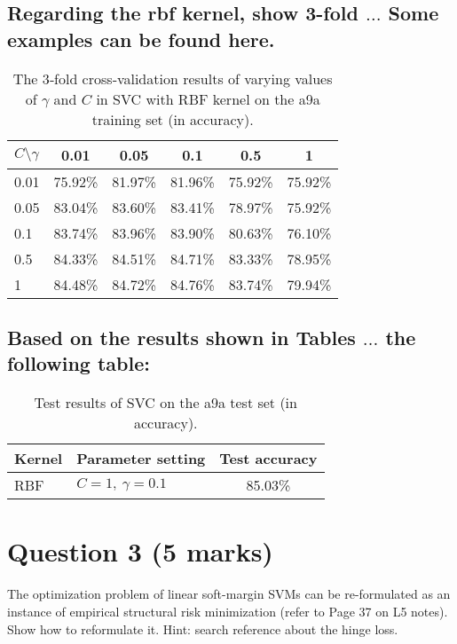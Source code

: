 \documentclass{article}
\begin{document}
\subsection{Regarding the rbf kernel, show 3-fold \(\dots\) Some examples can be found here.}

\begin{table}[H]
  \centering
  \caption{The 3‐fold cross‐validation results of varying values of $\gamma$ and $C$ in SVC with RBF kernel on the a9a training set (in accuracy).}
  \label{tab:rbf-cv}
  \begin{tabular}{lccccc}
    \toprule
    $C\!\setminus\!\gamma$ & 0.01    & 0.05    & 0.1     & 0.5     & 1      \\
    \midrule
    0.01                    & 75.92\% & 81.97\% & 81.96\% & 75.92\% & 75.92\%\\
    0.05                    & 83.04\% & 83.60\% & 83.41\% & 78.97\% & 75.92\%\\
    0.1                     & 83.74\% & 83.96\% & 83.90\% & 80.63\% & 76.10\%\\
    0.5                     & 84.33\% & 84.51\% & 84.71\% & 83.33\% & 78.95\%\\
    1                       & 84.48\% & 84.72\% & 84.76\% & 83.74\% & 79.94\%\\
    \bottomrule
  \end{tabular}
\end{table}


\subsection{Based on the results shown in Tables \(\dots\) the following table:}
\begin{table}[ht]
  \centering
  \caption{Test results of SVC on the a9a test set (in accuracy).}
  \label{tab:test-results}
  \begin{tabular}{l l c}
    \toprule
    Kernel & Parameter setting      & Test accuracy \\
    \midrule
    RBF    & $C=1,\ \gamma=0.1$     &  85.03\%  \\
    \bottomrule
  \end{tabular}
\end{table}


\section*{Question 3 (5 marks)}
The optimization problem of linear soft-margin SVMs can be re-formulated as an instance of empirical structural risk minimization (refer to Page 37 on L5 notes). Show how to reformulate it. Hint: search reference about the hinge loss.
\bigskip
\end{document}
